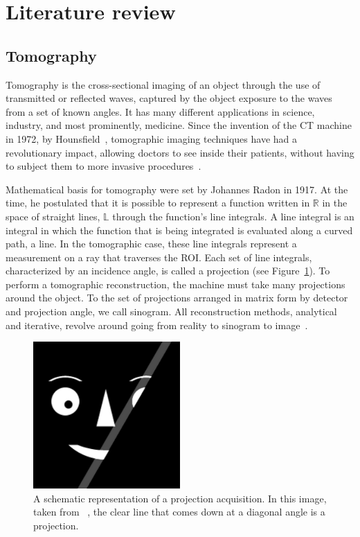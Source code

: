 

\section{Literature review}%
\label{sec:literature_review}

\subsection{Tomography}%
\label{sub:tomography}

Tomography is the cross-sectional imaging of an object through the use
of transmitted or reflected waves, captured by the object exposure to
the waves from a set of known angles. It has many different applications
in science, industry, and most prominently, medicine. Since the invention
of the \gls{CT} machine in 1972, by Hounsfield~\cite{Gunderman2006},
tomographic imaging techniques have had a revolutionary impact, allowing
doctors to see inside their patients, without having to subject them to
more invasive procedures~\cite{Kak2001}.

Mathematical basis for tomography were set by Johannes Radon in 1917. At
the time, he postulated that  it is possible to represent a function
written in $\mathbb{R}$ in the space of straight lines, $\mathbb{L}$
through the function's line integrals. A line integral is an integral in
which the function that is being integrated is evaluated along a curved
path, a line. In the tomographic case, these line integrals represent a
measurement on a ray that traverses the \gls{ROI}.  Each set of line
integrals, characterized by an incidence angle, is called a projection
(see Figure~\ref{fig:projection}). To perform a tomographic
reconstruction, the machine must take many projections around the
object. To the set of projections arranged in matrix form by detector
and projection angle, we call sinogram. All reconstruction methods,
analytical and iterative, revolve around going from reality to sinogram
to image~\cite{Bruyant2002, Kak2001, Herman1973, Herman1995, Herman2009,
Defrise2003}.

\begin{figure}[htpb]
    \centering
    \includegraphics[width=0.5\textwidth]{img/png/projections.png}
    \caption{A schematic representation of a projection acquisition. In
    this image, taken from ~\cite{Herman2009}, the clear line that comes
    down at a diagonal angle is a projection.}
    \label{fig:projection}
\end{figure}

